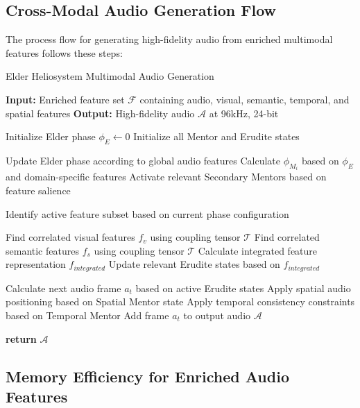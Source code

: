 \subsection{Cross-Modal Audio Generation Flow}

The process flow for generating high-fidelity audio from enriched multimodal features follows these steps:

\begin{algorithm}
\caption{Elder Heliosystem Multimodal Audio Generation}
\begin{algorithmic}[1]
\State \textbf{Input:} Enriched feature set $\mathcal{F}$ containing audio, visual, semantic, temporal, and spatial features
\State \textbf{Output:} High-fidelity audio $\mathcal{A}$ at 96kHz, 24-bit

\State Initialize Elder phase $\phi_E \gets 0$
\State Initialize all Mentor and Erudite states

    \State Update Elder phase according to global audio features
        \State Calculate $\phi_{M_i}$ based on $\phi_E$ and domain-specific features
        \State Activate relevant Secondary Mentors based on feature salience
    \EndFor
    
    \State Identify active feature subset based on current phase configuration
    
        \State Find correlated visual features $f_v$ using coupling tensor $\mathcal{T}$
        \State Find correlated semantic features $f_s$ using coupling tensor $\mathcal{T}$
        \State Calculate integrated feature representation $f_{integrated}$
        \State Update relevant Erudite states based on $f_{integrated}$
    \EndFor
    
    \State Calculate next audio frame $a_t$ based on active Erudite states
    \State Apply spatial audio positioning based on Spatial Mentor state
    \State Apply temporal consistency constraints based on Temporal Mentor
    \State Add frame $a_t$ to output audio $\mathcal{A}$
\EndFor

\State \textbf{return} $\mathcal{A}$
\end{algorithmic}
\end{algorithm}

\subsection{Memory Efficiency for Enriched Audio Features}

